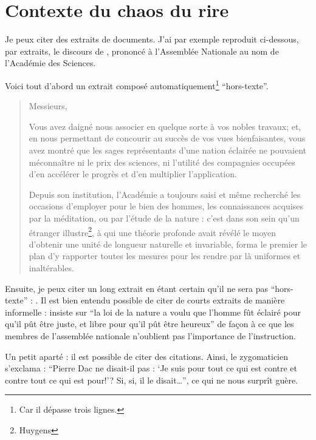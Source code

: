 \chapter{Contexte du chaos du rire}

Je peux citer des extraits de
documents. J'ai par exemple reproduit ci-dessous, par extraits, le discours de
\citeauthor{cond}, prononcé à l'Assemblée Nationale au nom de l'Académie des
Sciences.

Voici tout d'abord un extrait composé automatiquement\footnote{Car il dépasse
  trois lignes.} \enquote{hors-texte}.
%
\blockcquote[508-509]{cond}{%
  Messieurs,

  Vous avez daigné nous associer en quelque sorte à vos nobles
  travaux; et, en nous permettant de concourir au succès de vos vues
  bienfaisantes, vous avez montré que les sages représentants d'une
  nation éclairée ne pouvaient méconnaître ni le prix des sciences, ni
  l'utilité des compagnies occupées d'en accélérer le progrès et d'en
  multiplier l'application.

  Depuis son institution, l'Académie a toujours saisi et même
  recherché les occasions d'employer pour le bien des hommes, les
  connaissances acquises par la méditation, ou par l'étude de la
  nature : c'est dans son sein qu'un étranger
  illustre\footnote{Huygens}, à qui une théorie profonde avait révélé
  le moyen d'obtenir une unité de longueur naturelle et invariable,
  forma le premier le plan d'y rapporter toutes les mesures pour les
  rendre par là uniformes et inaltérables.
}

Ensuite, je peux citer un long extrait en étant certain qu'il ne
sera pas \enquote{hors-texte} :
. Il est bien entendu possible de citer de courts extraits
de manière informelle : \citeauthor{cond}
insiste sur \enquote{la loi de la nature a voulu que
  l'homme fût éclairé pour qu'il pût être juste, et libre pour qu'il
  pût être heureux} de façon à ce que les membres de l'assemblée
nationale n'oublient pas l'importance de l'instruction.

Un petit aparté : il est possible de citer des
citations. Ainsi, le zygomaticien
s'exclama : \enquote{Pierre Dac ne disait-il pas : \enquote{Je suis
    pour tout ce qui est contre et contre tout ce qui est pour!}?
  Si, si, il le disait\ldots{}}, ce qui ne nous surprît guère.

